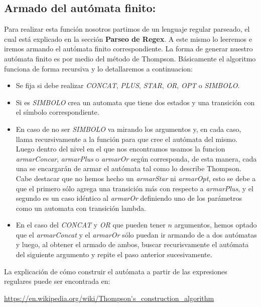 \subsection{Armado del autómata finito:}
Para realizar esta función nosotros partimos de un lenguaje regular parseado, el cual está explicado en la sección \textbf{Parseo de Regex}. A este mismo lo leeremos e iremos armando el autómata finito correspondiente.
La forma de generar nuestro autómata finito es por medio del método de Thompson. Básicamente el algoritmo funciona de forma recursiva y lo detallaremos a continuacion:
\begin{itemize}
\item Se fija si debe realizar \textit{CONCAT}, \textit{PLUS}, \textit{STAR}, \textit{OR}, \textit{OPT} o \textit{SIMBOLO}.
\item Si es \textit{SIMBOLO} crea un automata que tiene dos estados y una transición con el símbolo correspondiente.
\item En caso de no ser \textit{SIMBOLO} va mirando los argumentos y, en cada caso, llama recursivamente a la función para que cree el autómata del mismo. Luego dentro del nivel en el que nos encontramos usamos la funcion \textit{armarConcar}, \textit{armarPlus} o \textit{armarOr} según corresponda, de esta manera, cada una se encargarán de armar el autómata tal como lo describe Thompson. Cabe destacar que no hemos hecho un \textit{armarStar} ni \textit{armarOpt}, esto se debe a que el primero sólo agrega una transición más con respecto a \textit{armarPlus}, y el segundo es un caso idéntico al \textit{armarOr} definiendo uno de los parámetros como un automata con transición lambda.
\item En el caso del \textit{CONCAT} y \textit{OR} que pueden tener $n$ argumentos, hemos optado que el \textit{armarConcat} y el \textit{armarOr} sólo puedan ir armando de a dos autómatas y luego, al obtener el armado de ambos, buscar recurisvamente el autómata del siguiente argumento y repite el paso anterior sucesivamente.
\end{itemize}

La explicación de cómo construir el autómata a partir de las expresiones regulares puede ser encontrada en:

\url{https://en.wikipedia.org/wiki/Thompson's_construction_algorithm}

